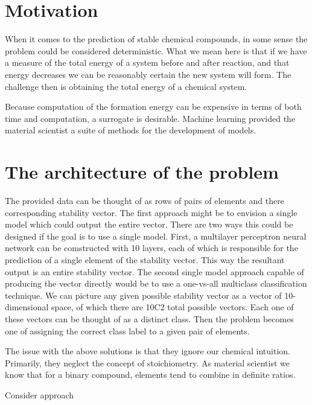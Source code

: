\section{Motivation}


When it comes to the prediction of stable chemical compounds,
in some sense the problem could be considered deterministic. What
we mean here is that if we have a measure of the total energy of a 
system before and after reaction, and that energy decreases we can
be reasonably certain the new system will form. The challenge then
is obtaining the total energy of a chemical system.

Because computation of the formation energy can be expensive in
terms of both time and computation, a surrogate is desirable. Machine
learning provided the material scientist a suite of methods for
the development of models.


\section{The architecture of the problem}


The provided data can be thought of as rows of pairs of elements and
there corresponding stability vector. The first approach might be to
envision a single model which could output the entire vector. There 
are two ways this could be designed if the goal is to use a single model.
First, a multilayer perceptron neural network can be comstructed with
10 layers, each of which is responsible for the prediction of a single
element of the stability vector. This way the resultant output is an
entire stability vector. The second single model approach capable of
producing the vector directly would be to use a one-vs-all multiclass
classification technique. We can picture any given possible stability
vector as a vector of 10-dimensional space, of which there are
10C2 total possible vectors. Each one of these vectors can be thought
of as a distinct class. Then the problem becomes one of assigning the
correct class label to a given pair of elements.

The issue with the above solutions is that they ignore our chemical
intuition. Primarily, they neglect the concept of stoichiometry. As
material scientist we know that for a binary compound, elements tend
to combine in definite ratios. 

Consider approach 